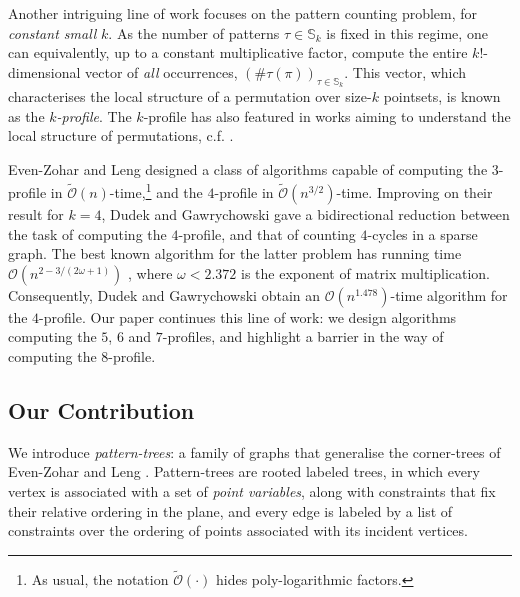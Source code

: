 \documentclass{article}
\newcommand{\pc}[2]{{\# \mathtt{ #1 } \left( #2 \right)}}
\theoremstyle{remark}
\newcommand{\Otilde}[1]{\widetilde{\mathcal{O}}\left( #1 \right)}
\theoremstyle{plain}
\begin{document}
Another intriguing line of work focuses on the pattern counting problem, for \textit{constant small} $k$.
As the number of patterns $\tau \in \mathbb{S}_k$ is fixed in this regime,
one can equivalently, up to a constant multiplicative factor, compute the entire $k!$-dimensional vector of \textit{all} occurrences,
$(\pc{\tau}{\pi})_{\tau \in \mathbb{S}_k}$.
This vector, which characterises the local structure of a permutation over size-$k$ pointsets,
is known as the \textit{$k$-profile}. 
The $k$-profile has also featured in works 
aiming to understand the local structure of permutations,
c.f. \cite{beniaminilavee2023balanced, even2020patterns, cooper2008symmetric}.

Even-Zohar and Leng \cite{even2021counting} designed a class of algorithms capable of computing the $3$-profile
in $\Otilde{n}$-time,\footnote{
As usual, the notation $\Otilde{\cdot}$ hides poly-logarithmic factors.}
and the $4$-profile in $\Otilde{n^{3/2}}$-time.
Improving on their result for $k=4$, Dudek and Gawrychowski \cite{dudek2020counting} gave a bidirectional
reduction between
the  task of computing the $4$-profile, and that of counting $4$-cycles in a sparse graph.
The best known algorithm for the latter problem has running time $\mathcal{O}(n^{2-3/(2\omega + 1)})$ \cite{williams2014finding},
where $\omega < 2.372$ \cite{duan2023faster} is the exponent of matrix multiplication.
Consequently, Dudek and Gawrychowski obtain an $\mathcal{O}(n^{1.478})$-time algorithm 
for the $4$-profile. 
Our paper continues this line of work: we design algorithms computing the $5$, $6$ and $7$-profiles,
and highlight a barrier in the way of computing the $8$-profile.

\subsection{Our Contribution}

We introduce \emph{pattern-trees}: a family of graphs that generalise the corner-trees of Even-Zohar and Leng \cite{even2021counting}.
Pattern-trees are rooted labeled trees, in which every vertex is associated with a set of \textit{point variables},
along with constraints that fix their relative ordering in the plane,
and every edge is labeled by a list of constraints over the ordering
of points associated with its incident vertices. 
\end{document}
